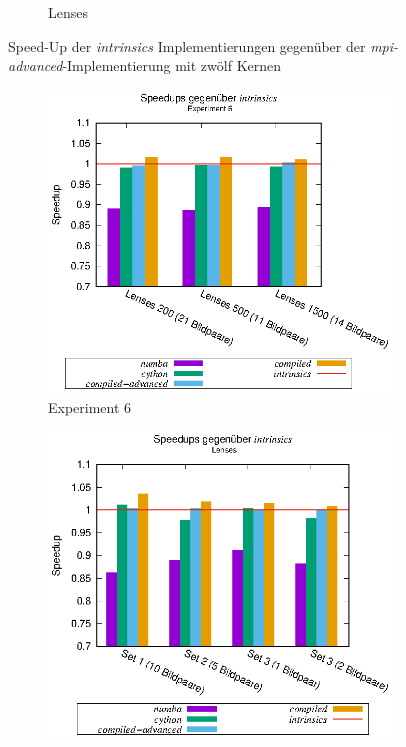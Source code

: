 \begin{center}
\begin{figure}[h]
\begin{subfigure}[b]{0.54\textwidth}
			\caption{Lenses}
			\label{fig:speedups_intrinsics_lenses}
		\end{subfigure}
		\caption{Speed-Up der \textit{intrinsics} Implementierungen gegenüber der \textit{mpi-advanced}-Implementierung mit zwölf Kernen}
		\label{fig:speedups_intrinsics}
	\end{figure}
\end{center}

\begin{center}
	\begin{figure}[h]
		\begin{subfigure}[b]{0.54\textwidth}
			\centering
			\includegraphics[width=\textwidth]{pdf/speedups_exp6}
			\caption{Experiment 6}
			\label{fig:speedups_exp6}
		\end{subfigure}
		\hspace{-0.9cm}
		\begin{subfigure}[b]{0.54\textwidth}
			\centering
			\includegraphics[width=\textwidth]{pdf/speedups_lenses}

\end{subfigure}
\end{figure}
\end{center}
